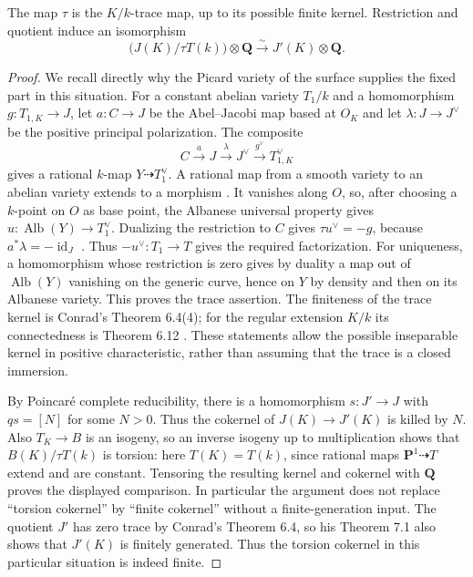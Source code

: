 \begin{lemma}
\label{D:fixed}
The map $\tau$ is the $K/k$-trace map, up to its possible finite kernel.
Restriction and quotient induce an isomorphism
\[
 \bigl(J(K)/\tau T(k)\bigr)\otimes\mathbf Q
       \xrightarrow{\sim}J'(K)\otimes\mathbf Q.
\]
\end{lemma}
\begin{proof}
We recall directly why the Picard variety of the surface supplies the
fixed part in this situation.  For a constant abelian variety $T_1/k$
and a homomorphism $g:T_{1,K}\to J$, let $a:C\to J$ be the Abel--Jacobi
map based at $O_K$ and let $\lambda:J\to J^\vee$ be the positive principal
polarization.  The composite
\[
 C\xrightarrow{a}J\xrightarrow{\lambda}J^\vee
     \xrightarrow{g^\vee}T_{1,K}^\vee
\]
gives a rational $k$-map $Y\dashrightarrow T_1^\vee$.
A rational map from a smooth variety to an abelian variety extends to
a morphism \cite[Theorem 3.1]{MilneAV}.  It vanishes along $O$, so, after
choosing a $k$-point on $O$ as base point, the Albanese universal property
gives $u:\operatorname{Alb}(Y)\to T_1^\vee$.
Dualizing the restriction to $C$ gives
$\tau u^\vee=-g$, because $a^*\lambda=-\operatorname{id}_J$
\cite[Lemma 6.9 and Remark 6.10(c), p.~23]{MilneJV}.
Thus $-u^\vee:T_1\to T$ gives the required factorization.
For uniqueness, a homomorphism whose restriction is zero gives by
duality a map out of $\operatorname{Alb}(Y)$ vanishing on the generic
curve, hence on $Y$ by density and then on its Albanese variety.
This proves the trace assertion.  The finiteness of
the trace kernel is Conrad's Theorem 6.4(4); for the regular extension
$K/k$ its connectedness is Theorem 6.12 \cite{ConradTrace}.  These
statements allow the possible inseparable kernel in positive
characteristic, rather than assuming that the trace is a closed immersion.

By Poincar\'e complete reducibility, there is a homomorphism $s:J'\to J$
with $q s=[N]$ for some $N>0$.  Thus the cokernel of $J(K)\to J'(K)$ is
killed by $N$.  Also $T_K\to B$ is an isogeny, so an inverse isogeny up
to multiplication shows that $B(K)/\tau T(k)$ is torsion: here
$T(K)=T(k)$, since rational maps $\mathbf P^1\dashrightarrow T$ extend
and are constant.  Tensoring the resulting kernel and cokernel with
$\mathbf Q$ proves the displayed comparison.  In particular the argument
does not replace ``torsion cokernel'' by ``finite cokernel'' without a
finite-generation input.
The quotient $J'$ has zero trace by Conrad's Theorem 6.4, so his
Theorem 7.1 also shows that $J'(K)$ is finitely generated.  Thus the
torsion cokernel in this particular situation is indeed finite.
\end{proof}

